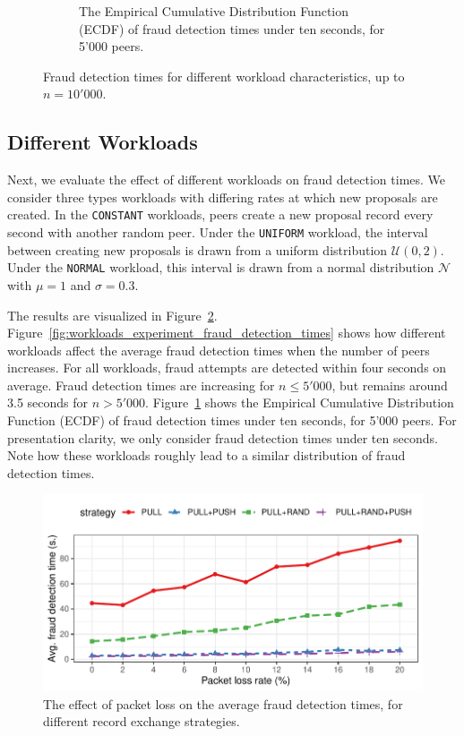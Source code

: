 \begin{figure}[!t]
\begin{subfigure}{.5\columnwidth}
		\caption{The Empirical Cumulative Distribution Function (ECDF) of fraud detection times under ten seconds, for 5'000 peers.}
		\label{fig:workloads_experiment_ecdf_fraud_detection_times}
	\end{subfigure}
	\caption{Fraud detection times for different workload characteristics, up to $ n = 10'000 $.}
	\label{fig:workloads_experiments}
\end{figure}

\subsection{Different Workloads}
Next, we evaluate the effect of different workloads on fraud detection times.
We consider three types workloads with differing rates at which new proposals are created.
In the \texttt{CONSTANT} workloads, peers create a new proposal record every second with another random peer.
Under the \texttt{UNIFORM} workload, the interval between creating new proposals is drawn from a uniform distribution $ \mathcal{U}(0, 2) $.
Under the \texttt{NORMAL} workload, this interval is drawn from a normal distribution $ \mathcal{N} $ with $ \mu = 1 $ and $ \sigma = 0.3 $.

The results are visualized in Figure~\ref{fig:workloads_experiments}.
Figure~\ref{fig:workloads_experiment_fraud_detection_times} shows how different workloads affect the average fraud detection times when the number of peers increases.
For all workloads, fraud attempts are detected within four seconds on average.
Fraud detection times are increasing for $ n \leq 5'000 $, but remains around 3.5 seconds for $ n > 5'000 $.
Figure~\ref{fig:workloads_experiment_ecdf_fraud_detection_times} shows the Empirical Cumulative Distribution Function (ECDF) of fraud detection times under ten seconds, for 5'000 peers.
For presentation clarity, we only consider fraud detection times under ten seconds.
Note how these workloads roughly lead to a similar distribution of fraud detection times.

\begin{figure}[t]
	\centering
	\includegraphics[width=.9\linewidth]{trustchain/assets/fraud_times_send_failure}
	\caption{The effect of packet loss on the average fraud detection times, for different record exchange strategies.}
	\label{fig:fraud_times_link_failures}
\end{figure}

